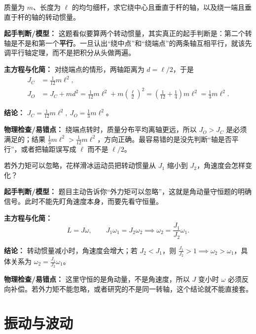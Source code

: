 \documentclass[lang=cn,11pt]{elegantbook}
\begin{document}
\begin{exercise}[]
质量为 \(m\)、长度为 \(\ell\) 的均匀细杆，求它绕中心且垂直于杆的轴，以及绕一端且垂直于杆的轴的转动惯量。
\end{exercise}

\begin{solution}
\textbf{起手判断/模型：} 这题看似要算两个转动惯量，其实真正的起手判断是：第二个转轴是不是和第一个\textbf{平行}。一旦认出“绕中点”和“绕端点”的两条轴互相平行，就该先调平行轴定理，而不是把积分从头做两遍。

\textbf{主方程与化简：} 对绕端点的情形，两轴距离为 \(d=\ell/2\)，于是
\[
\begin{aligned}
J_C&=\frac{1}{12}m\ell^2,\\
J_O&=J_C+md^2
=\frac{1}{12}m\ell^2+m\left(\frac{\ell}{2}\right)^2
=\left(\frac{1}{12}+\frac{1}{4}\right)m\ell^2
=\frac{1}{3}m\ell^2.
\end{aligned}
\]

\textbf{结论：} \(J_C=\frac{1}{12}m\ell^2,\ J_O=\frac{1}{3}m\ell^2\)。

\textbf{物理检查/易错点：} 绕端点转时，质量分布平均离轴更远，所以 \(J_O>J_C\) 是必须满足的；结果 \(\frac13 m\ell^2>\frac1{12}m\ell^2\)，方向正确。最容易错的是没先判断“轴是否平行”，或者把轴距误写成 \(\ell\) 而不是 \(\ell/2\)。
\end{solution}

\begin{exercise}[]
若外力矩可以忽略，花样滑冰运动员把转动惯量从 \(J_1\) 缩小到 \(J_2\)，角速度会怎样变化？
\end{exercise}

\begin{solution}
\textbf{起手判断/模型：} 题目主动告诉你“外力矩可以忽略”，这就是角动量守恒题的明确信号。此时不能先盯角速度本身，而要先看守恒量。

\textbf{主方程与化简：}
\[
L=J\omega,\qquad
J_1\omega_1=J_2\omega_2
\implies
\omega_2=\frac{J_1}{J_2}\omega_1.
\]

\textbf{结论：} 转动惯量减小时，角速度会增大；若 \(J_2<J_1\)，则 \(\frac{J_1}{J_2}>1\implies \omega_2>\omega_1\)，具体关系为 \(\omega_2=\frac{J_1}{J_2}\omega_1\)。

\textbf{物理检查/易错点：} 这里守恒的是角动量，不是角速度，所以 \(J\) 变小时 \(\omega\) 必须反向补偿。若外力矩不能忽略，或者研究的不是同一转轴，这个结论就不能直接套。
\end{solution}

\part{振动与波动}
\end{document}
